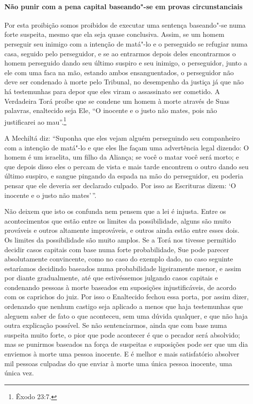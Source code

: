 \begin{multicols}{2}
\paragraph{Não punir com a pena capital baseando"-se em provas circunstanciais}

Por esta proibição somos proibidos de executar uma sentença baseando"-se
numa forte suspeita, mesmo que ela seja quase conclusiva. Assim, se um
homem perseguir seu inimigo com a intenção de matá"-lo e o perseguido se
refugiar numa casa, seguido pelo perseguidor, e se ao entrarmos depois
deles encontrarmos o homem perseguido dando seu último suspiro e seu
inimigo, o perseguidor, junto a ele com uma faca na mão, estando ambos
ensanguentados, o perseguidor não deve ser condenado à morte pelo
Tribunal, no desempenho da justiça já que não há testemunhas para depor
que eles viram o assassinato ser cometido. A Verdadeira Torá\starr{} proíbe que
se condene um homem à morte através de Suas palavras, enaltecido seja
Ele, ``O inocente e o justo não mates, pois não justificarei ao mau''.\footnote{Êxodo 23:7.}

A Mechiltá\starr{} diz: ``Suponha que eles vejam alguém perseguindo seu
companheiro com a intenção de matá"-lo e que eles lhe façam uma
advertência legal dizendo: O homem é um israelita, um filho da Aliança;
se você o matar você será morto; e que depois disso eles o percam de
vista e mais tarde encontrem o outro dando seu último suspiro, e sangue
pingando da espada na mão do perseguidor, eu poderia pensar que ele
deveria ser declarado culpado. Por isso as Escrituras dizem: `O inocente
e o justo não mates'\,''.

Não deixem que isto os confunda nem pensem que a lei é injusta. Entre os
acontecimentos que estão entre os limites da possibilidade, alguns são
muito prováveis e outros altamente improváveis, e outros ainda estão
entre esses dois. Os limites da possibilidade são muito amplos. Se a
Torá\starr{} nos tivesse permitido decidir casos capitais com base numa forte
probabilidade, Sue pode parecer absolutamente convincente, como no caso
do exemplo dado, no caso seguinte estaríamos decidindo baseados numa
probabilidade ligeiramente menor, e assim por diante gradualmente, até
que estivéssemos julgando casos capitais e condenando pessoas à morte
baseados em suposições injustificáveis, de acordo com os caprichos do
juiz. Por isso o Enaltecido fechou essa porta, por assim dizer,
ordenando que nenhum castigo seja aplicado a menos que haja testemunhas
que aleguem saber de fato o que aconteceu, sem uma dúvida qualquer, e
que não haja outra explicação possível. Se não sentenciarmos, ainda que
com base numa suspeita muito forte, o pior que pode acontecer é que o
pecador será absolvido; mas se punirmos baseados na força de suspeitas e
suposições pode ser que um dia enviemos à morte uma pessoa inocente. E é
melhor e mais satisfatório absolver mil pessoas culpadas do que enviar à
morte uma única pessoa inocente, uma única vez.


\end{multicols}
